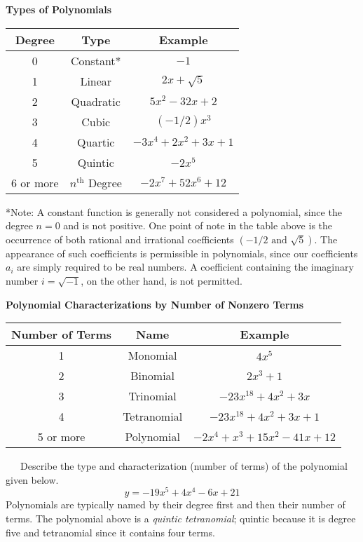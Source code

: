 \begin{center}
\textbf{Types of Polynomials}\pp
\begin{tabular}{ | c | c | c | } 
\hline
Degree & Type & Example \\ 
\hline
0 & Constant* & $-1$ \\ 
\hline
1 & Linear & $2x+\sqrt{5}$ \\ 
\hline
2 & Quadratic & $5x^2 - 32x+2$ \\ 
\hline
3 & Cubic & $(-1/2)x^{3}$ \\ 
\hline
4 & Quartic & $-3x^{4} +2x^2+3x + 1$ \\ 
\hline
5  & Quintic & $-2x^5$ \\ 
\hline
6 or more  & $n^{\text{th}}$ Degree & $-2x^{7} + 52x^6 + 12$ \\ 
\hline
\end{tabular}
\end{center}
*Note: A constant function is generally not considered a polynomial, since the degree $n=0$ and is not positive.\pp
One point of note in the table above is the occurrence of both rational and irrational coefficients $\left(-1/2\text{~and~}\sqrt{5}\right)$.  The appearance of such coefficients is permissible in polynomials, since our coefficients $a_i$ are simply required to be real numbers.  A coefficient containing the imaginary number $i=\sqrt{-1}$, on the other hand, is not permitted.\
\begin{center}
\textbf{Polynomial Characterizations by Number of Nonzero Terms}\pp
\begin{tabular}{ | c | c | c | } 
\hline
Number of Terms & Name & Example \\ 
\hline
1 & Monomial & $4x^5$ \\ 
\hline
2 & Binomial & $2x^3 +1$ \\ 
\hline
3 & Trinomial & $-23x^{18} +4x^2+3x$ \\ 
\hline
4 & Tetranomial & $-23x^{18} +4x^2+3x + 1$ \\ 
\hline
5 or more & Polynomial & $-2x^4 + x^3 +15x^2-41x + 12$ \\ 
\hline
\end{tabular}
\end{center}

\begin{example}~~~Describe the type and characterization (number of terms) of the polynomial given below.
$$y = -19x^5+4x^4-6x+21$$
Polynomials are typically named by their degree first and then their number of terms.  The polynomial above is a \textit{quintic tetranomial}; quintic because it is degree five and tetranomial since it contains four terms.
\end{example}

